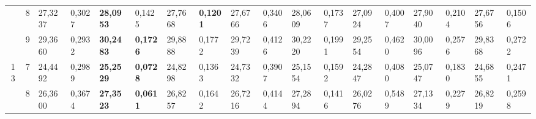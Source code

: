\documentclass[conference]{IEEEtran}
\begin{document}
\begin{table*}[]
\begin{tabular}{|cc|ll|ll|ll|ll|ll|ll|ll|ll|}
		\multicolumn{1}{|c|}{}                    & 8          & \multicolumn{1}{l|}{27,3237}           & 0,3027                            & \multicolumn{1}{l|}{\textbf{28,0953}}  & 0,1425                            & \multicolumn{1}{l|}{27,7668}           & \textbf{0,1201}                   & \multicolumn{1}{l|}{27,6766}           & 0,3406                            & \multicolumn{1}{l|}{28,0609}           & 0,1737                            & \multicolumn{1}{l|}{27,0924}           & 0,4007                            & \multicolumn{1}{l|}{27,9040}           & 0,2104                            & \multicolumn{1}{l|}{27,6756}           & 0,1506                            \\ \cline{2-18} 
		\multicolumn{1}{|c|}{}                    & 9          & \multicolumn{1}{l|}{29,3660}           & 0,2932                            & \multicolumn{1}{l|}{\textbf{30,2483}}  & \textbf{0,1726}                   & \multicolumn{1}{l|}{29,8888}           & 0,1772                            & \multicolumn{1}{l|}{29,7239}           & 0,4126                            & \multicolumn{1}{l|}{30,2220}           & 0,1991                            & \multicolumn{1}{l|}{29,2554}           & 0,4620                            & \multicolumn{1}{l|}{30,0096}           & 0,2576                            & \multicolumn{1}{l|}{29,8368}           & 0,2722                            \\ \hline
		\multicolumn{1}{|c|}{\multirow{3}{*}{13}} & 7          & \multicolumn{1}{l|}{24,4492}           & 0,2989                            & \multicolumn{1}{l|}{\textbf{25,2529}}  & \textbf{0,0728}                   & \multicolumn{1}{l|}{24,8298}           & 0,1363                            & \multicolumn{1}{l|}{24,7332}           & 0,3907                            & \multicolumn{1}{l|}{25,1554}           & 0,1592                            & \multicolumn{1}{l|}{24,2847}           & 0,4080                            & \multicolumn{1}{l|}{25,0747}           & 0,1830                            & \multicolumn{1}{l|}{24,6855}           & 0,2471                            \\ \cline{2-18} 
		\multicolumn{1}{|c|}{}                    & 8          & \multicolumn{1}{l|}{26,3600}           & 0,3674                            & \multicolumn{1}{l|}{\textbf{27,3523}}  & \textbf{0,0611}                   & \multicolumn{1}{l|}{26,8257}           & 0,1642                            & \multicolumn{1}{l|}{26,7216}           & 0,4144                            & \multicolumn{1}{l|}{27,2894}           & 0,1416                            & \multicolumn{1}{l|}{26,0276}           & 0,5489                            & \multicolumn{1}{l|}{27,1334}           & 0,2279                            & \multicolumn{1}{l|}{26,8219}           & 0,2598                            \\ \cline{2-18} 

\end{tabular}
\end{table*}
\end{document}

